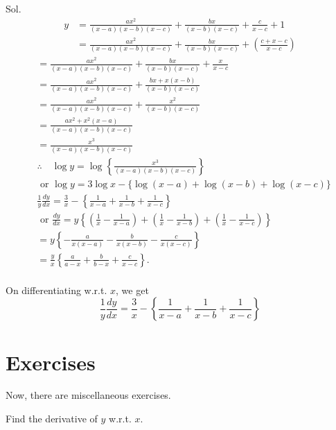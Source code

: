 \begin{enumerate}
\begin{outline}
    Sol.
$$
\begin{aligned}
y & =\frac{a x^2}{(x-a)(x-b)(x-c)}+\frac{b x}{(x-b)(x-c)}+\frac{c}{x-c}+1 \\
& =\frac{a x^2}{(x-a)(x-b)(x-c)}+\frac{b x}{(x-b)(x-c)}+\left(\frac{c+x-c}{x-c}\right)
\end{aligned}
$$
$$
\begin{aligned}
& =\frac{a x^2}{(x-a)(x-b)(x-c)}+\frac{b x}{(x-b)(x-c)}+\frac{x}{x-c} \\
& =\frac{a x^2}{(x-a)(x-b)(x-c)}+\frac{b x+x(x-b)}{(x-b)(x-c)} \\
& =\frac{a x^2}{(x-a)(x-b)(x-c)}+\frac{x^2}{(x-b)(x-c)} \\
& =\frac{a x^2+x^2(x-a)}{(x-a)(x-b)(x-c)} \\
& =\frac{x^3}{(x-a)(x-b)(x-c)} \\
& \therefore \quad \log y=\log \left\{\frac{x^3}{(x-a)(x-b)(x-c)}\right\} \\
& \text { or } \log y=3 \log x-\{\log (x-a)+\log (x-b)+\log (x-c)\} \\
& \frac{1}{y} \frac{d y}{d x}=\frac{3}{x}-\left\{\frac{1}{x-a}+\frac{1}{x-b}+\frac{1}{x-c}\right\} \\
& \text { or } \frac{d y}{d x}=y\left\{\left(\frac{1}{x}-\frac{1}{x-a}\right)+\left(\frac{1}{x}-\frac{1}{x-b}\right)+\left(\frac{1}{x}-\frac{1}{x-c}\right)\right\} \\
& =y\left\{-\frac{a}{x(x-a)}-\frac{b}{x(x-b)}-\frac{c}{x(x-c)}\right\} \\
& =\frac{y}{x}\left\{\frac{a}{a-x}+\frac{b}{b-x}+\frac{c}{x-c}\right\} \text {. } \\
&
\end{aligned}
$$

On differentiating w.r.t. $x$, we get
$$
\frac{1}{y} \frac{d y}{d x}=\frac{3}{x}-\left\{\frac{1}{x-a}+\frac{1}{x-b}+\frac{1}{x-c}\right\}
$$
\end{outline}




\end{enumerate}




\section{Exercises}

Now, there are miscellaneous exercises.

Find the derivative of $y$ w.r.t. $x$.

